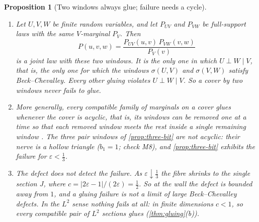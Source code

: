 \documentclass[11pt]{article}
\newtheorem{proposition}[theorem]{Proposition}
\theoremstyle{definition}
\begin{document}
\begin{proposition}[Two windows always glue; failure needs a cycle]\label{prop:two-layers}
\begin{enumerate}[label=(\alph*)]
\item Let $U,V,W$ be finite random variables, and let $P_{UV}$ and $P_{VW}$ be full-support laws with the same $V$-marginal $P_V$. Then
  \[
  P(u,v,w)=\frac{P_{UV}(u,v)\,P_{VW}(v,w)}{P_V(v)}
  \]
  is a joint law with these two windows. It is the only one in which $U\perp W\mid V$, that is, the only one for which the windows
  $\sigma(U,V)$ and $\sigma(V,W)$ satisfy Beck--Chevalley. Every other gluing violates $U\perp W\mid V$. So a cover by two windows never fails
  to glue.
\item More generally, every compatible family of marginals on a cover glues whenever the cover is acyclic, that is, its windows can
  be removed one at a time so that each removed window meets the rest inside a single remaining window \cite{Vorobev1962}. The three
  pair windows of \cref{prop:three-bit} are not acyclic: their nerve is a hollow triangle ($b_1=1$; check M8), and
  \cref{prop:three-bit} exhibits the failure for $\varepsilon<\tfrac13$.
\item The defect does not detect the failure. As $\varepsilon\downarrow\tfrac13$ the fibre shrinks to the single section $J$, where
  $c=|2\varepsilon-1|/(2\varepsilon)=\tfrac12$. So at the wall the defect is bounded away from $1$, and a gluing failure is not a limit
  of large Beck--Chevalley defects. In the $L^2$ sense nothing fails at all: in finite dimensions $c<1$, so every compatible pair of
  $L^2$ sections glues (\cref{thm:gluing}(b)).
\end{enumerate}
\end{proposition}
\end{document}
